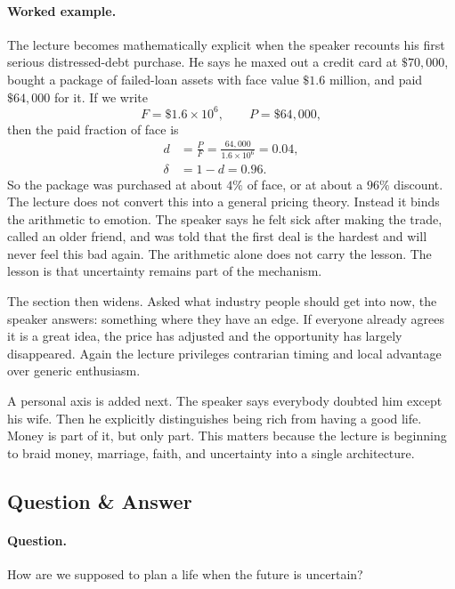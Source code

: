 \paragraph{Worked example.} The lecture becomes mathematically explicit when the speaker recounts his first serious distressed-debt purchase. He says he maxed out a credit card at \(\$70{,}000\), bought a package of failed-loan assets with face value \(\$1.6\) million, and paid \(\$64{,}000\) for it. If we write
\[
F=\$1.6\times 10^6,
\qquad
P=\$64{,}000,
\]
then the paid fraction of face is
\begin{align}
d &= \frac{P}{F}
   = \frac{64{,}000}{1.6\times 10^6}
   = 0.04,\\
\delta &= 1-d = 0.96.
\end{align}
So the package was purchased at about \(4\%\) of face, or at about a \(96\%\) discount. The lecture does not convert this into a general pricing theory. Instead it binds the arithmetic to emotion. The speaker says he felt sick after making the trade, called an older friend, and was told that the first deal is the hardest and will never feel this bad again. The arithmetic alone does not carry the lesson. The lesson is that uncertainty remains part of the mechanism.

The section then widens. Asked what industry people should get into now, the speaker answers: something where they have an edge. If everyone already agrees it is a great idea, the price has adjusted and the opportunity has largely disappeared. Again the lecture privileges contrarian timing and local advantage over generic enthusiasm.

A personal axis is added next. The speaker says everybody doubted him except his wife. Then he explicitly distinguishes being rich from having a good life. Money is part of it, but only part. This matters because the lecture is beginning to braid money, marriage, faith, and uncertainty into a single architecture.

\subsection{Question \& Answer}

\paragraph{Question.} How are we supposed to plan a life when the future is uncertain?

